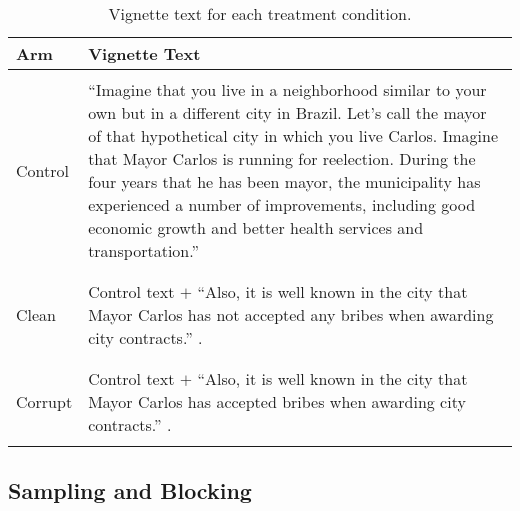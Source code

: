 \documentclass[11pt,english]{article}
\begin{document}
\begin{table}[H]
\begin{tabular}{p{1.5cm}|p{15cm}} \hline
Arm & Vignette Text\\ \hline \hline\\
Control & ``Imagine that you live in a neighborhood similar to your own but in a different city in Brazil. Let’s call the mayor of that hypothetical city in which you live Carlos. Imagine that Mayor Carlos is running for reelection. During the four years that he has been mayor, the municipality has experienced a number of improvements, including good economic growth and better health services and
transportation.'' \citep[][p.66]{weitzshapirowinters2016}\\\\\hline \\
Clean & Control text $+$ ``Also, it is well known in the city that Mayor Carlos has not accepted any bribes
when awarding city contracts.'' \citep[][p.66, emphasis added]{weitzshapirowinters2016}.\\ \\ \hline \\
Corrupt & Control text $+$ ``Also, it is well known in the city that Mayor Carlos has accepted bribes when
awarding city contracts.'' \citep[][p.66, emphasis added]{weitzshapirowinters2016}.\\ \\ \hline
\end{tabular}
\caption{Vignette text for each treatment condition.}\label{tab:vignettes}
\end{table}


\subsection*{Sampling and Blocking}
\end{document}
